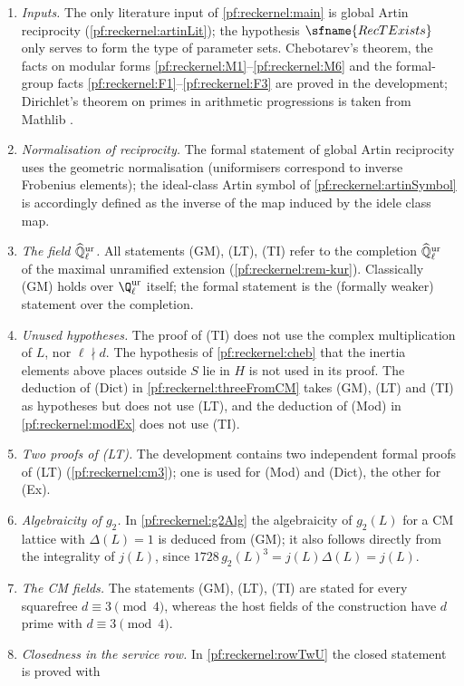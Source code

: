 \begin{enumerate}
\item \emph{Inputs.} The only literature input of \cref{pf:reckernel:main} is global Artin reciprocity
  (\cref{pf:reckernel:artinLit}); the hypothesis $\sfname{RecTExists}$ only serves to form the type of parameter sets.
  Chebotarev's theorem, the facts on modular forms \ref{pf:reckernel:M1}--\ref{pf:reckernel:M6} and the formal-group
  facts \ref{pf:reckernel:F1}--\ref{pf:reckernel:F3} are proved in the development; Dirichlet's theorem on primes in
  arithmetic progressions is taken from Mathlib \cite{Mathlib2020}.
\item \emph{Normalisation of reciprocity.} The formal statement of global Artin reciprocity uses the geometric
  normalisation (uniformisers correspond to inverse Frobenius elements); the ideal-class Artin symbol of
  \cref{pf:reckernel:artinSymbol} is accordingly defined as the inverse of the map induced by the idele class map.
\item \emph{The field $\widehat{\mathbb{Q}}{}_\ell^{\mathrm{ur}}$.} All statements (GM), (LT), (TI) refer to the completion $\widehat{\mathbb{Q}}{}_\ell^{\mathrm{ur}}$ of the maximal
  unramified extension (\cref{pf:reckernel:rem-kur}). Classically (GM) holds over $\Q_\ell^{\mathrm{ur}}$ itself; the
  formal statement is the (formally weaker) statement over the completion.
\item \emph{Unused hypotheses.} The proof of (TI) does not use the complex multiplication of $L$, nor $\ell\nmid d$. The
  hypothesis of \cref{pf:reckernel:cheb} that the inertia elements above places outside $S$ lie in $H$ is not used
  in its proof. The deduction of (Dict) in \cref{pf:reckernel:threeFromCM} takes (GM), (LT) and (TI) as hypotheses
  but does not use (LT), and the deduction of (Mod) in \cref{pf:reckernel:modEx} does not use (TI).
\item \emph{Two proofs of (LT).} The development contains two independent formal proofs of (LT)
  (\cref{pf:reckernel:cm3}); one is used for (Mod) and (Dict), the other for (Ex).
\item \emph{Algebraicity of $g_2$.} In \cref{pf:reckernel:g2Alg} the algebraicity of $g_2(L)$ for a CM lattice with
  $\Delta(L)=1$ is deduced from (GM); it also follows directly from the integrality of $j(L)$, since
  $1728\,g_2(L)^3=j(L)\Delta(L)=j(L)$.
\item \emph{The CM fields.} The statements (GM), (LT), (TI) are stated for every squarefree $d\equiv3\pmod 4$, whereas
  the host fields of the construction have $d$ prime with $d\equiv3\pmod4$.
\item \emph{Closedness in the service row.} In \cref{pf:reckernel:rowTwU} the closed statement is proved with

\end{enumerate}
